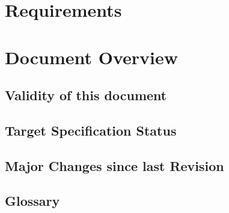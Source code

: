 
\chapter{Requirements}



\chapter{Document Overview}

\section{Validity of this document}

\section{Target Specification Status}

\section{Major Changes since last Revision}

\tableofcontents
\listoffigures
\listoftables
\section{Glossary}


